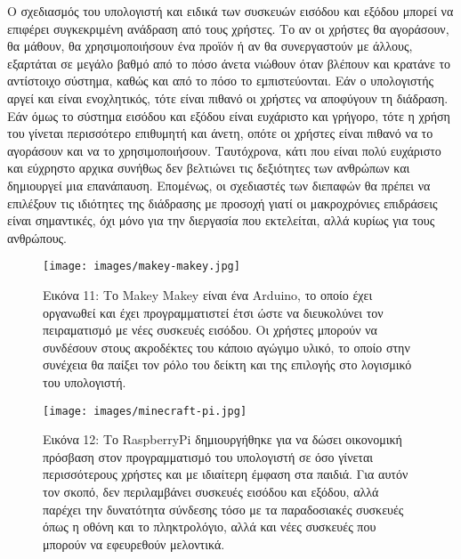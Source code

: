 \documentclass[
]{article}
\begin{document}
O σχεδιασμός του υπολογιστή και ειδικά των συσκευών εισόδου και εξόδου
μπορεί να επιφέρει συγκεκριμένη ανάδραση από τους χρήστες. Το αν οι
χρήστες θα αγοράσουν, θα μάθουν, θα χρησιμοποιήσουν ένα προϊόν ή αν θα
συνεργαστούν με άλλους, εξαρτάται σε μεγάλο βαθμό από το πόσο άνετα
νιώθουν όταν βλέπουν και κρατάνε το αντίστοιχο σύστημα, καθώς και από το
πόσο το εμπιστεύονται. Εάν ο υπολογιστής αργεί και είναι ενοχλητικός,
τότε είναι πιθανό οι χρήστες να αποφύγουν τη διάδραση. Εάν όμως το
σύστημα εισόδου και εξόδου είναι ευχάριστο και γρήγορο, τότε η χρήση του
γίνεται περισσότερο επιθυμητή και άνετη, οπότε οι χρήστες είναι πιθανό
να το αγοράσουν και να το χρησιμοποιήσουν. Ταυτόχρονα, κάτι που είναι
πολύ ευχάριστο και εύχρηστο αρχικα συνήθως δεν βελτιώνει τις δεξιότητες
των ανθρώπων και δημιουργεί μια επανάπαυση. Επομένως, οι σχεδιαστές των
διεπαφών θα πρέπει να επιλέξουν τις ιδιότητες της διάδρασης με προσοχή
γιατί οι μακροχρόνιες επιδράσεις είναι σημαντικές, όχι μόνο για την
διεργασία που εκτελείται, αλλά κυρίως για τους ανθρώπους.

\leavevmode{}%
\begin{figure}
\hypertarget{fig:makey_makey_front}{%
\centering
\texttt{[image: images/makey-makey.jpg]}
\caption{Εικόνα 11: Το Makey Makey είναι ένα Arduino, το οποίο έχει
οργανωθεί και έχει προγραμματιστεί έτσι ώστε να διευκολύνει τον
πειραματισμό με νέες συσκευές εισόδου. Οι χρήστες μπορούν να συνδέσουν
στους ακροδέκτες του κάποιο αγώγιμο υλικό, το οποίο στην συνέχεια θα
παίξει τον ρόλο του δείκτη και της επιλογής στο λογισμικό του
υπολογιστή.}\label{fig:makey_makey_front}
}
\end{figure}

\leavevmode{}%
\begin{figure}
\hypertarget{fig:minecraft-pi}{%
\centering
\texttt{[image: images/minecraft-pi.jpg]}
\caption{Εικόνα 12: Το RaspberryPi δημιουργήθηκε για να δώσει οικονομική
πρόσβαση στον προγραμματισμό του υπολογιστή σε όσο γίνεται περισσότερους
χρήστες και με ιδιαίτερη έμφαση στα παιδιά. Για αυτόν τον σκοπό, δεν
περιλαμβάνει συσκευές εισόδου και εξόδου, αλλά παρέχει την δυνατότητα
σύνδεσης τόσο με τα παραδοσιακές συσκευές όπως η οθόνη και το
πληκτρολόγιο, αλλά και νέες συσκευές που μπορούν να εφευρεθούν
μελοντικά.}\label{fig:minecraft-pi}
}
\end{figure}
\end{document}
